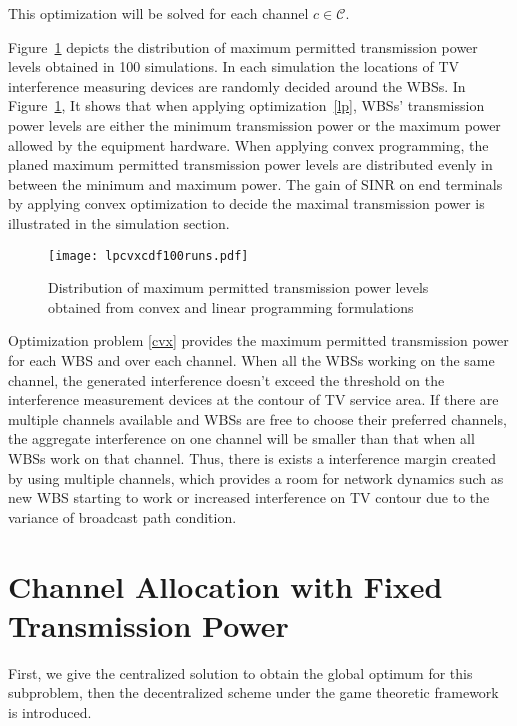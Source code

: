 This optimization will be solved for each channel $c\in \mathcal{C}$.

Figure~\ref{lpcvx} depicts the distribution of maximum permitted transmission power levels obtained in 100 simulations.
In each simulation the locations of TV interference measuring devices are randomly decided around the WBSs.
In Figure~\ref{lpcvx}, It shows that when applying optimization~\ref{lp}, WBSs' transmission power levels are either the minimum transmission power or the maximum power allowed by the equipment hardware.
When applying convex programming, the planed maximum permitted transmission power levels are distributed evenly in between the minimum and maximum power.
The gain of SINR on end terminals by applying convex optimization to decide the maximal transmission power is illustrated in the simulation section.

\begin{figure}[h!]
  \centering
  \texttt{[image: lpcvxcdf100runs.pdf]}
  \caption{Distribution of maximum permitted transmission power levels obtained from convex and linear programming formulations}
\label{lpcvx}
\end{figure}


Optimization problem \ref{cvx} provides the maximum permitted transmission power for each WBS and over each channel.
When all the WBSs working on the same channel, the generated interference doesn't exceed the threshold on the interference measurement devices at the contour of TV service area. 
If there are multiple channels available and WBSs are free to choose their preferred channels, the aggregate interference on one channel will be smaller than that when all WBSs work on that channel. 
Thus, there is exists a interference margin created by using multiple channels, which provides a room for network dynamics such as new WBS starting to work or increased interference on TV contour due to the variance of broadcast path condition. 


\section{Channel Allocation with Fixed Transmission Power}
\label{CA_fixedPower_2subproblem}
First, we give the centralized solution to obtain the global optimum for this subproblem, then the decentralized scheme under the game theoretic framework is introduced.

